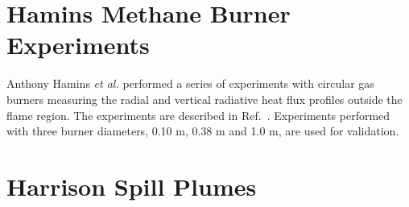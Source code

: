 %
%
%


\section{Hamins Methane Burner Experiments}

Anthony Hamins {\em et al.} performed a series of experiments with circular gas burners measuring the radial and vertical radiative heat flux profiles outside the flame region. The experiments are described in Ref.~\cite{Hostikka:3}. Experiments performed with three burner diameters, 0.10 m, 0.38 m and 1.0 m, are used for validation.


\section{Harrison Spill Plumes}

